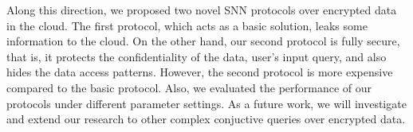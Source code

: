 \documentclass{article}
\begin{document}
Along this direction, we proposed 
two novel SNN protocols over encrypted 
data in the cloud. The first protocol, which acts as a basic solution, leaks some information to 
the cloud. On the other hand, our second protocol is fully secure, that is, it protects the confidentiality of the data, user's 
input query, and also hides 
the data access patterns. However, the second protocol is more expensive compared to the basic protocol. 
Also, we evaluated the performance of our protocols under different parameter settings. As a future work, 
we will investigate and extend our research to other complex conjuctive queries over 
encrypted data. 



 
\end{document}

